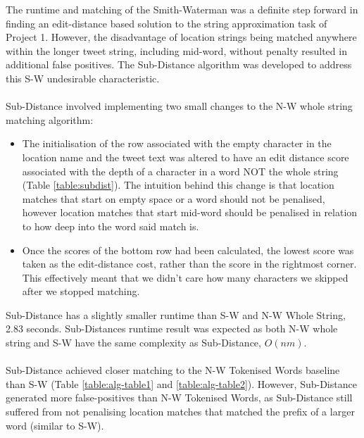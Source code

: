 \documentclass[11pt,a4paper]{article}
\begin{document}
The runtime and matching of the Smith-Waterman was a definite step forward in finding an edit-distance based solution to the string approximation task of Project 1. However, the disadvantage of location strings being matched anywhere within the longer tweet string, including mid-word, without penalty resulted in additional false positives. The Sub-Distance algorithm was developed to address this S-W undesirable characteristic.\\\\
Sub-Distance involved implementing two small changes to the N-W whole string matching algorithm:
\begin{itemize}
\item The initialisation of the row associated with the empty character in the location name and the tweet text was altered to have an edit distance score associated with the depth of a character in a word NOT the whole string (Table \ref{table:subdist}). The intuition behind this change is that location matches that start on empty space or a word should not be penalised, however location matches that start mid-word should be penalised in relation to how deep into the word said match is.
\item Once the scores of the bottom row had been calculated, the lowest score was taken as the edit-distance cost, rather than the score in the rightmost corner. This effectively meant that we didn't care how many characters we skipped after we stopped matching. 
\end{itemize}
Sub-Distance has a slightly smaller runtime than S-W and N-W Whole String, 2.83 seconds. Sub-Distances runtime result was expected as both N-W whole string and S-W have the same complexity as Sub-Distance, $O(nm)$.\\\\
Sub-Distance achieved closer matching to the N-W Tokenised Words baseline than S-W (Table \ref{table:alg-table1} and \ref{table:alg-table2}). However, Sub-Distance generated more false-positives than N-W Tokenised Words, as Sub-Distance still suffered from not penalising location matches that matched the prefix of a larger word (similar to S-W).
\end{document}
